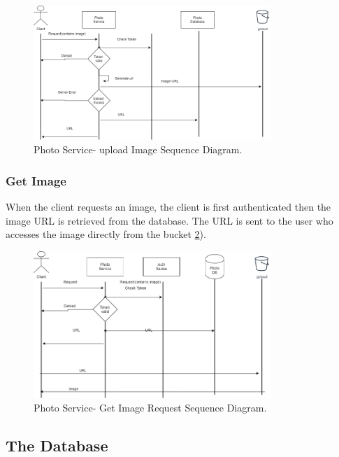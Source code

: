 \begin{figure}
	\begin{center}
		\includegraphics[width=90mm,scale=1]{img/photos/upload-image-sequence.png}
		\caption{Photo Service- upload Image Sequence Diagram.}
		\label{photo:uploadsequence}
	\end{center}
\end{figure}


\subsubsection{Get Image}

When the client requests an image, the client is first authenticated then the image URL is retrieved from the database. The URL is sent to the user who accesses the image directly from the bucket \ref{photo:getsequence}).

\begin{figure}
	\begin{center}
		\includegraphics[width=90mm,scale=1]{img/photos/Image-request.png}
		\caption{Photo Service- Get Image Request Sequence Diagram.}
		\label{photo:getsequence}
	\end{center}
\end{figure}

\subsection{The Database}

